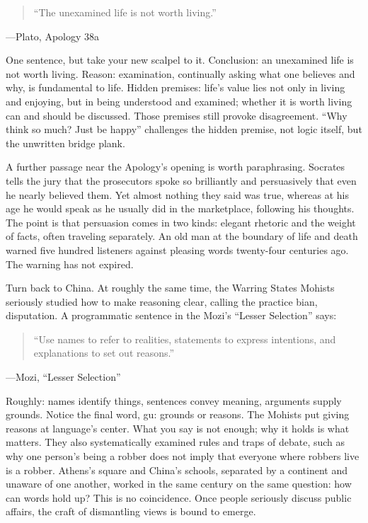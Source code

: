 \begin{quote}
``The unexamined life is not worth living.''
\end{quote}
---Plato, Apology 38a

One sentence, but take your new scalpel to it. Conclusion: an unexamined life is not worth living. Reason: examination, continually asking what one believes and why, is fundamental to life. Hidden premises: life's value lies not only in living and enjoying, but in being understood and examined; whether it is worth living can and should be discussed. Those premises still provoke disagreement. ``Why think so much? Just be happy'' challenges the hidden premise, not logic itself, but the unwritten bridge plank.

A further passage near the Apology's opening is worth paraphrasing. Socrates tells the jury that the prosecutors spoke so brilliantly and persuasively that even he nearly believed them. Yet almost nothing they said was true, whereas at his age he would speak as he usually did in the marketplace, following his thoughts. The point is that persuasion comes in two kinds: elegant rhetoric and the weight of facts, often traveling separately. An old man at the boundary of life and death warned five hundred listeners against pleasing words twenty-four centuries ago. The warning has not expired.

Turn back to China. At roughly the same time, the Warring States Mohists seriously studied how to make reasoning clear, calling the practice bian, disputation. A programmatic sentence in the Mozi's ``Lesser Selection'' says:

\begin{quote}
``Use names to refer to realities, statements to express intentions, and explanations to set out reasons.''
\end{quote}
---Mozi, ``Lesser Selection''

Roughly: names identify things, sentences convey meaning, arguments supply grounds. Notice the final word, gu: grounds or reasons. The Mohists put giving reasons at language's center. What you say is not enough; why it holds is what matters. They also systematically examined rules and traps of debate, such as why one person's being a robber does not imply that everyone where robbers live is a robber. Athens's square and China's schools, separated by a continent and unaware of one another, worked in the same century on the same question: how can words hold up? This is no coincidence. Once people seriously discuss public affairs, the craft of dismantling views is bound to emerge.

